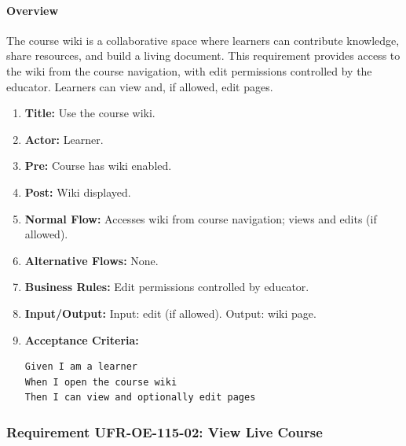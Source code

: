 \paragraph{Overview}
The course wiki is a collaborative space where learners can contribute knowledge, share resources, and build a living document. This requirement provides access to the wiki from the course navigation, with edit permissions controlled by the educator. Learners can view and, if allowed, edit pages.
\begin{enumerate}[label=\textbf{\arabic*.}]
\item \textbf{Title:} Use the course wiki.
\item \textbf{Actor:} Learner.
\item \textbf{Pre:} Course has wiki enabled.
\item \textbf{Post:} Wiki displayed.
\item \textbf{Normal Flow:} Accesses wiki from course navigation; views and edits (if allowed).
\item \textbf{Alternative Flows:} None.
\item \textbf{Business Rules:} Edit permissions controlled by educator.
\item \textbf{Input/Output:} Input: edit (if allowed). Output: wiki page.
\item \textbf{Acceptance Criteria:}
    \begin{verbatim}
Given I am a learner
When I open the course wiki
Then I can view and optionally edit pages
    \end{verbatim}
\end{enumerate}

\subsubsection{Requirement UFR-OE-115-02: View Live Course}
